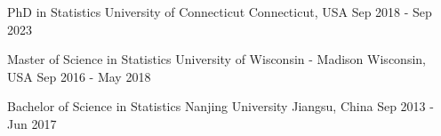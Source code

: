 
\vspace{-2.0mm}
\begin{cventries}

  \cventry
    {PhD in Statistics} %
    {University of Connecticut} %
    {Connecticut, USA} %
    {Sep 2018 - Sep 2023} %
    {}%
    \vspace{-4.0mm}

    \cventry
    {Master of Science in Statistics} %
    {University of Wisconsin - Madison} %
    {Wisconsin, USA} %
    {Sep 2016 - May 2018} %
    {}%
    \vspace{-4.0mm}

    \cventry
    {Bachelor of Science in Statistics} %
    {Nanjing University} %
    {Jiangsu, China} %
    {Sep 2013 - Jun 2017} %
    {}

\end{cventries}

